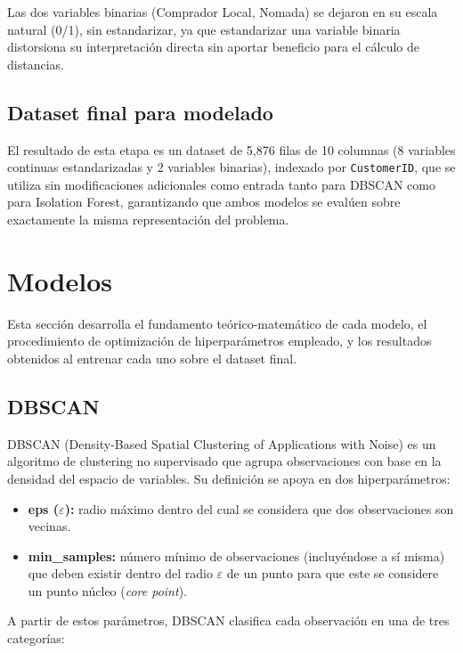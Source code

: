 \documentclass[11pt]{article}
\begin{document}
Las dos variables binarias (Comprador Local, Nomada) se dejaron en su escala natural (0/1), sin
estandarizar, ya que estandarizar una variable binaria distorsiona su interpretación directa sin aportar
beneficio para el cálculo de distancias.

\subsection*{Dataset final para modelado}

El resultado de esta etapa es un dataset de 5,876 filas de 10 columnas (8 variables continuas
estandarizadas y 2 variables binarias), indexado por \texttt{CustomerID}, que se utiliza sin modificaciones
adicionales como entrada tanto para DBSCAN como para Isolation Forest, garantizando que ambos
modelos se evalúen sobre exactamente la misma representación del problema.

\section*{Modelos}

Esta sección desarrolla el fundamento teórico-matemático de cada modelo, el procedimiento de
optimización de hiperparámetros empleado, y los resultados obtenidos al entrenar cada uno sobre el
dataset final.

\subsection*{DBSCAN}

DBSCAN (Density-Based Spatial Clustering of Applications with Noise) es un algoritmo de clustering no
supervisado que agrupa observaciones con base en la densidad del espacio de variables. Su definición se
apoya en dos hiperparámetros:

\begin{itemize}
    \item \textbf{eps ($\varepsilon$):} radio máximo dentro del cual se considera que dos observaciones son vecinas.
    \item \textbf{min\_samples:} número mínimo de observaciones (incluyéndose a sí misma) que deben existir dentro del radio $\varepsilon$ de un punto para que este se considere un punto núcleo (\textit{core point}).
\end{itemize}

A partir de estos parámetros, DBSCAN clasifica cada observación en una de tres categorías:
\end{document}
